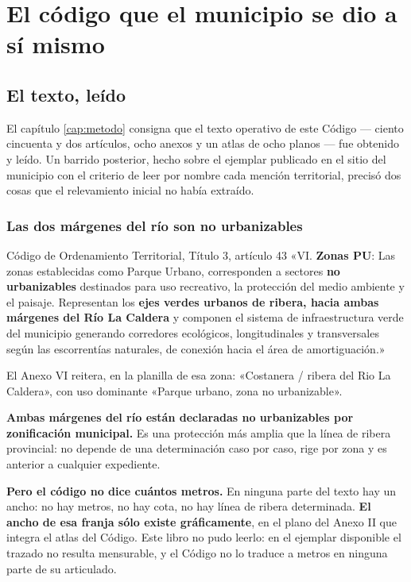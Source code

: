 \chapter{El código que el municipio se dio a sí mismo}

\label{cap:cot}
\section{El texto, leído}

El capítulo \ref{cap:metodo} consigna que el texto operativo de este Código --- ciento cincuenta y dos artículos, ocho anexos y un atlas de ocho planos --- fue obtenido y leído. Un barrido posterior, hecho sobre el ejemplar publicado en el sitio del municipio con el criterio de leer por nombre cada mención territorial, precisó dos cosas que el relevamiento inicial no había extraído.

\subsection*{Las dos márgenes del río son no urbanizables}

\begin{ficha}{Código de Ordenamiento Territorial, Título 3, artículo 43}
«VI. \textbf{Zonas PU}: Las zonas establecidas como Parque Urbano, corresponden a sectores
\textbf{no urbanizables} destinados para uso recreativo, la protección del medio ambiente y el
paisaje. Representan los \textbf{ejes verdes urbanos de ribera, hacia ambas márgenes del Río
La Caldera} y componen el sistema de infraestructura verde del municipio generando corredores
ecológicos, longitudinales y transversales según las escorrentías naturales, de conexión hacia
el área de amortiguación.»

El Anexo VI reitera, en la planilla de esa zona: «Costanera / ribera del Rio La Caldera», con
uso dominante «Parque urbano, zona no urbanizable».
\end{ficha}

\textbf{Ambas márgenes del río están declaradas no urbanizables por zonificación municipal.}
Es una protección más amplia que la línea de ribera provincial: no depende de una
determinación caso por caso, rige por zona y es anterior a cualquier expediente.

\textbf{Pero el código no dice cuántos metros.} En ninguna parte del texto hay un ancho: no hay
metros, no hay cota, no hay línea de ribera determinada. \textbf{El ancho de esa franja sólo existe gráficamente}, en el plano del Anexo II que integra el atlas del Código. Este libro no pudo leerlo: en el ejemplar disponible el trazado no resulta mensurable, y el Código no lo traduce a metros en ninguna parte de su articulado.

